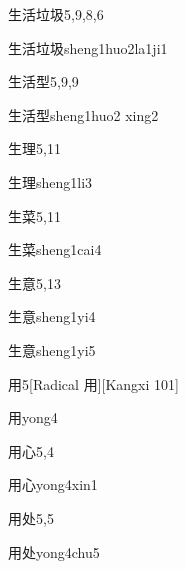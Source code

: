 \begin{entry}{生活垃圾}{5,9,8,6}
  \begin{phonetics}{生活垃圾}{sheng1huo2la1ji1}
  \end{phonetics}
\end{entry}

\begin{entry}{生活型}{5,9,9}
  \begin{phonetics}{生活型}{sheng1huo2 xing2}
  \end{phonetics}
\end{entry}

\begin{entry}{生理}{5,11}
  \begin{phonetics}{生理}{sheng1li3}
  \end{phonetics}
\end{entry}

\begin{entry}{生菜}{5,11}
  \begin{phonetics}{生菜}{sheng1cai4}
  \end{phonetics}
\end{entry}

\begin{entry}{生意}{5,13}
  \begin{phonetics}{生意}{sheng1yi4}
  \end{phonetics}
  \begin{phonetics}{生意}{sheng1yi5}
  \end{phonetics}
\end{entry}

\begin{entry}{用}{5}[Radical 用][Kangxi 101]
  \begin{phonetics}{用}{yong4}
  \end{phonetics}
\end{entry}

\begin{entry}{用心}{5,4}
  \begin{phonetics}{用心}{yong4xin1}
  \end{phonetics}
\end{entry}

\begin{entry}{用处}{5,5}
  \begin{phonetics}{用处}{yong4chu5}
  \end{phonetics}
\end{entry}

